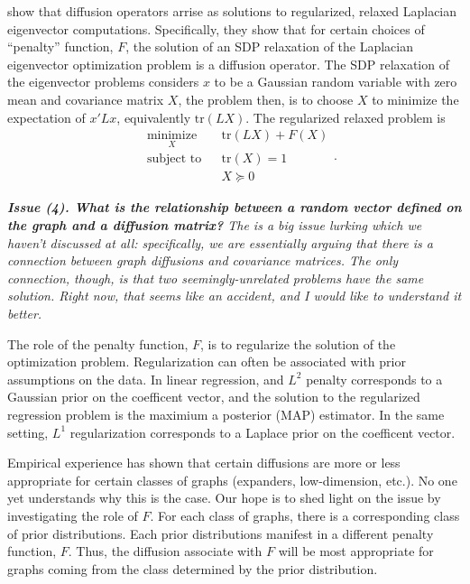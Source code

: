 \documentclass{article}
\begin{document}
\cite{mahoney2010implementing} show that diffusion operators arrise as solutions to regularized, relaxed Laplacian eigenvector computations.  Specifically, they show that for certain choices of ``penalty'' function, $F$, the solution of an SDP relaxation of the Laplacian eigenvector optimization problem is a diffusion operator.  The SDP relaxation of the eigenvector problems considers $x$ to be a Gaussian random variable with zero mean and covariance matrix $X$, the problem then, is to choose $X$ to minimize the expectation of $x' L x$, equivalently $\mathrm{tr}(L X)$.  The regularized relaxed problem is
\[
\begin{aligned}
  & \underset{X}{\text{minimize}}
  & & \mathrm{tr}(LX) + F(X) \\
  & \text{subject to}
  & & \mathrm{tr}(X) = 1 \\
  & & & X \succeq 0
\end{aligned}.
\]

\textit{\textbf{Issue (4).  What is the relationship between a random vector defined on the graph and a diffusion matrix?} The is a big issue lurking which we haven't discussed at all: specifically, we are essentially arguing that there is a connection between graph diffusions and covariance matrices.  The only connection, though, is that two seemingly-unrelated problems have the same solution.  Right now, that seems like an accident, and I would like to understand it better.}

The role of the penalty function, $F$, is to regularize the solution of the optimization problem.  Regularization can often be associated with prior assumptions on the data.  In linear regression, and $L^2$ penalty corresponds to a Gaussian prior on the coefficent vector, and the solution to the regularized regression problem is the maximium a posterior (MAP) estimator.  In the same setting, $L^1$ regularization corresponds to a Laplace prior on the coefficent vector.

Empirical experience has shown that certain diffusions are more or less appropriate for certain classes of graphs (expanders, low-dimension, etc.).  No one yet understands why this is the case.  Our hope is to shed light on the issue by investigating the role of $F$.  For each class of graphs, there is a corresponding class of prior distributions.  Each prior distributions manifest in a different penalty function, $F$.  Thus, the diffusion associate with $F$ will be most appropriate for graphs coming from the class determined by the prior distribution.
\end{document}
